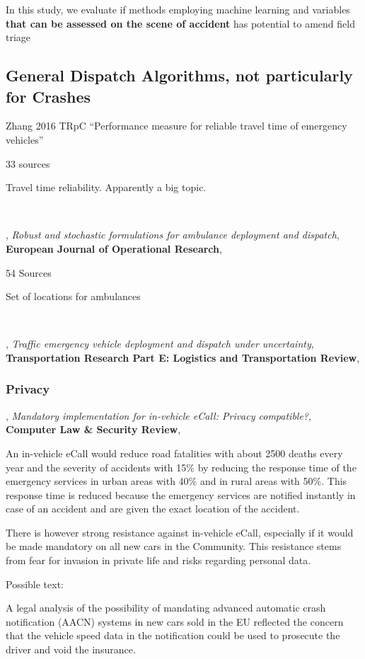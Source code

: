 In this study, we evaluate if methods employing machine learning and variables {\bf that can be assessed on the scene of accident} has
potential to amend field triage


\subsection{General Dispatch Algorithms, not particularly for Crashes}

\cite{ZHANG201697}
Zhang 2016
TRpC
``Performance measure for reliable travel time of emergency vehicles''

33 sources

Travel time reliability.  Apparently a big topic.  

\

\cite{BERTSIMAS2019557},
{\it Robust and stochastic formulations for ambulance deployment and dispatch},
{\bf European Journal of Operational Research},

54 Sources

Set of locations for ambulances

\

\cite{ZHEN2024103449},
{\it Traffic emergency vehicle deployment and dispatch under uncertainty},
{\bf Transportation Research Part E: Logistics and Transportation Review},

\subsubsection{Privacy}

\cite{GEUENS2010385},
{\it Mandatory implementation for in-vehicle eCall: Privacy compatible?},
{\bf Computer Law \& Security Review},

An in-vehicle
eCall would reduce road fatalities with about 2500 deaths
every year and the severity of accidents with 15\% by reducing
the response time of the emergency services in urban areas
with 40\% and in rural areas with 50\%. This response time is
reduced because the emergency services are notified instantly
in case of an accident and are given the exact location of the accident.

There is however strong resistance against in-vehicle
eCall, especially if it would be made mandatory on all new
cars in the Community. This resistance stems from fear for
invasion in private life and risks regarding personal data.

Possible text:

A legal analysis of the possibility of mandating advanced automatic crash notification (AACN) systems in new cars sold in the EU reflected the concern that the vehicle speed data in the notification could be used to prosecute the driver and void the insurance. \cite{GEUENS2010385}

